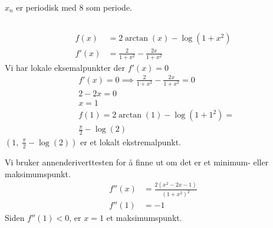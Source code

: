 \documentclass[defaultpackages]{cheatsheet}
\begin{document}
$x_n$ er periodisk med 8 som periode.
\subsection*{}
\subsubsection{}
\begin{align*}
	f(x) &= 2 \arctan (x) - \log(1+x^2)\\
	f'(x) &= \frac{2}{1+x^2} - \frac{2x}{1+x^2}
\end{align*}
	Vi har lokale eksemalpunkter der $f'(x) = 0$
	\begin{align*}
	&f'(x) = 0 \implies \frac{2}{1+x^2} - \frac{2x}{1+x^2} = 0\\
	&2 - 2x = 0\\
	&x = 1\\
	&f(1) = 2 \arctan (1) - \log(1 + 1^2) =\\
	&\frac{\pi}{2} - \log(2)
\end{align*}
	$\left(1,\;\frac{\pi}{2} - \log(2)\right)$ er et lokalt ekstremalpunkt.

Vi bruker annenderiverttesten for å finne ut om det er et minimum- eller maksimumspunkt.
\begin{align*}
f''(x) &= \frac{2(x^2-2x-1)}{(1+x^2)^2}\\
f''(1) &= -1
\end{align*}
Siden $f''(1) < 0$, er $x=1$ et maksimumspunkt.
\end{document}
